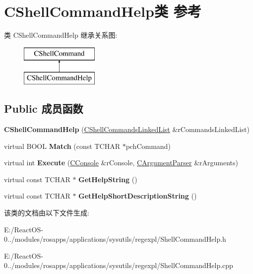 \hypertarget{class_c_shell_command_help}{}\section{C\+Shell\+Command\+Help类 参考}
\label{class_c_shell_command_help}
类 C\+Shell\+Command\+Help 继承关系图\+:\begin{figure}[H]
\begin{center}
\leavevmode
\includegraphics[height=2.000000cm]{class_c_shell_command_help}
\end{center}
\end{figure}
\subsection*{Public 成员函数}
\begin{DoxyCompactItemize}
\item 
\mbox{\label{class_c_shell_command_help_aafb2c8f4ed2640e2fd090dd39cc998e9}} 
{\bfseries C\+Shell\+Command\+Help} (\hyperlink{class_c_shell_commands_linked_list}{C\+Shell\+Commands\+Linked\+List} \&r\+Commands\+Linked\+List)
\item 
\mbox{\label{class_c_shell_command_help_a984e155d5f1f2cc1898cf0d9d16f6305}} 
virtual B\+O\+OL {\bfseries Match} (const T\+C\+H\+AR $\ast$pch\+Command)
\item 
\mbox{\label{class_c_shell_command_help_a61c1d9ac71808d2d2bbe1a980b82444e}} 
virtual int {\bfseries Execute} (\hyperlink{class_c_console}{C\+Console} \&r\+Console, \hyperlink{class_c_argument_parser}{C\+Argument\+Parser} \&r\+Arguments)
\item 
\mbox{\label{class_c_shell_command_help_a453d4214ee6b2b1abbcd1e6e5c2687ea}} 
virtual const T\+C\+H\+AR $\ast$ {\bfseries Get\+Help\+String} ()
\item 
\mbox{\label{class_c_shell_command_help_a42772cc39205426692ec165e518e07dd}} 
virtual const T\+C\+H\+AR $\ast$ {\bfseries Get\+Help\+Short\+Description\+String} ()
\end{DoxyCompactItemize}


该类的文档由以下文件生成\+:\begin{DoxyCompactItemize}
\item 
E\+:/\+React\+O\+S-\/0../modules/rosapps/applications/sysutils/regexpl/Shell\+Command\+Help.\+h\item 
E\+:/\+React\+O\+S-\/0../modules/rosapps/applications/sysutils/regexpl/Shell\+Command\+Help.\+cpp\end{DoxyCompactItemize}
